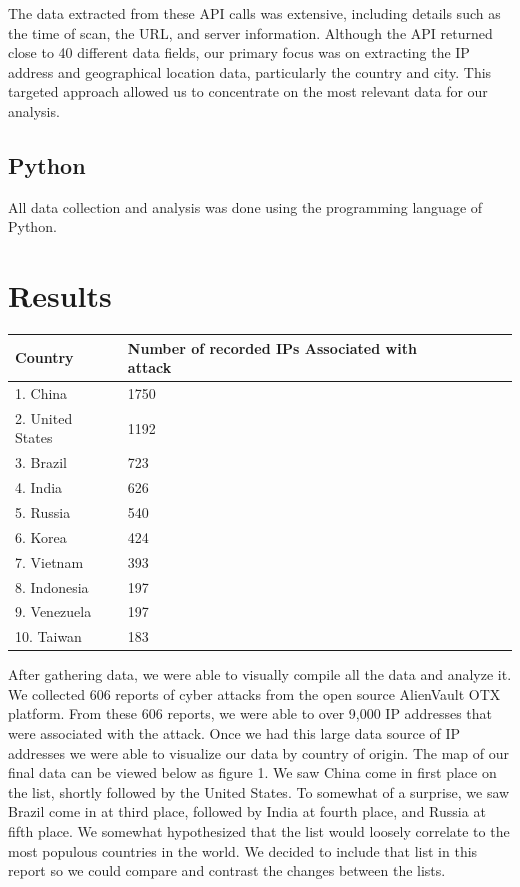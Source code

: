 \documentclass[letterpaper, 10 pt, conference]{ieeeconf}  %
\begin{document}
    The data extracted from these API calls was extensive, including details such as the time of scan, the URL, and server information. Although the API returned close to 40 different data fields, our primary focus was on extracting the IP address and geographical location data, particularly the country and city. This targeted approach allowed us to concentrate on the most relevant data for our analysis. 
    
    \subsection*{Python}
    All data collection and analysis was done using the programming language of Python. 

\section{Results}
\begin {table}[h]
\small
\begin{tabular}{ || p{6em} | p{4.2cm}| p{1cm} | p{2cm} | p{1cm} || } 
\hline
 Country & Number of recorded IPs Associated with attack\\ 
 \hline\hline
 1. China & 1750\\ 
 \hline
 2. United States & 1192\\
 \hline
 3. Brazil & 723\\
 \hline
 4. India & 626\\
 \hline
 5. Russia & 540\\
 \hline
 6. Korea & 424\\
 \hline
 7. Vietnam & 393\\
 \hline
 8. Indonesia & 197\\
 \hline
 9. Venezuela & 197\\
 \hline
 10. Taiwan & 183\\
 \hline
\end{tabular}
\end {table}
After gathering data, we were able to visually compile all the data and analyze it. We collected 606 reports of cyber attacks from the open source AlienVault OTX platform. From these 606 reports, we were able to over 9,000 IP addresses that were associated with the attack. Once we had this large data source of IP addresses we were able to visualize our data by country of origin. The map of our final data can be viewed below as figure 1.  
We saw China come in first place on the list, shortly followed by the United States. To somewhat of a surprise, we saw Brazil come in at third place, followed by India at fourth place, and Russia at fifth place. We somewhat hypothesized that the list would loosely correlate to the most populous countries in the world. We decided to include that list in this report so we could compare and contrast the changes between the lists.
\end{document}
